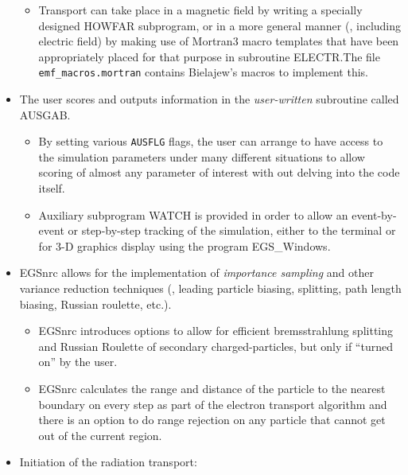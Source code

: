 \begin{itemize}
\begin{itemize}
   
  \item Transport can take place in a magnetic field by writing
  a specially designed HOWFAR subprogram, or in a more general
  manner (\eg, including electric field) by making use of
  Mortran3 macro templates that have been appropriately placed
  for that purpose in subroutine ELECTR.The file {\tt emf\_macros.mortran}
  contains Bielajew's macros to implement this.
  \end{itemize} 
 
\item The user scores and outputs information in the
{\it user-written} subroutine called AUSGAB.
   
  \begin{itemize} 

  \item By setting various {\tt AUSFLG} flags, the user can arrange to have
access to the simulation parameters under many different situations to
allow scoring of almost any parameter of interest with out delving into the
code itself.

  \item Auxiliary subprogram WATCH is provided in order to allow
  an event-by-event or step-by-step tracking of the simulation, either to
the terminal or for 3-D graphics display using the program EGS\_Windows.
 \end{itemize} 
 
\item EGSnrc allows for the implementation of {\it importance
sampling} and other variance reduction techniques (\eg, leading
particle biasing, splitting, path length biasing, Russian
roulette, etc.). 
  \begin{itemize} 
  \item EGSnrc introduces options to allow for efficient bremsstrahlung 
    splitting and Russian Roulette of secondary charged-particles, but only 
    if ``turned on'' by the user.
  \item EGSnrc calculates the range and distance of the particle to the
   nearest boundary on every step as part of the electron transport algorithm
   and there is an option to do range rejection on any particle that cannot get out of
   the current region.
 
\end{itemize} 

\item Initiation of the radiation transport:
   

\end{itemize}

